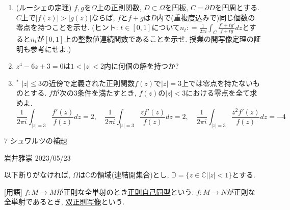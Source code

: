 \documentclass[dvipdfmx,a4paper,11pt]{article}
\newcommand{\C}{\mathbb{C}}
\newcommand{\D}{\mathbb{D}}
\theoremstyle{definition}
\begin{document}
\begin{enumerate}[label=\textbf{問}6.\arabic*]
   \item (ルーシェの定理)
   $f,g$を$\Omega$上の正則関数, $D \subset \Omega$を円板, $C = \partial D$を円周とする.
   $C$上で$|f(z)| > |g(z)|$ならば, $f$と$f+g$は$D$内で(重複度込みで)同じ個数の零点を持つことを示せ.
   (ヒント: $t \in [0,1]$について$n_{t} : = \frac{1}{2 \pi i} \int_{C} \frac{f' + t g'}{f +t g} dz$とすると$n_t$が$[0,1]$上の整数値連続関数であることを示せ. 授業の開写像定理の証明も参考にせよ.)
   
   
   \item $z^4 - 6z + 3=0$は$1 < |z| < 2$内に何個の解を持つか?
 
   
   \item $^{*}$ $|z| \le 3$の近傍で定義された正則関数$f(z)$で$|z|=3$上では零点を持たないものとする. 
   $f$が次の3条件を満たすとき, $f(z)$の$|z |<3$における零点を全て求めよ.
   $$
\frac{1}{2 \pi i} \int_{|z|=3} \frac{f'(z)}{f(z)} dz =2, \quad
\frac{1}{2 \pi i} \int_{|z|=3} \frac{zf'(z)}{f(z)} dz =2, \quad
\frac{1}{2 \pi i} \int_{|z|=3} \frac{z^2f'(z)}{f(z)} dz =-4 
   $$

 
     \end{enumerate}  

\newpage


\begin{center}
{\Large 7 シュワルツの補題}
\end{center}

\begin{flushright}
 岩井雅崇 2023/05/23
\end{flushright}
以下断りがなければ, $\Omega$は$\C$の領域(連結開集合)とし, $\D=\{z \in \C |  |z| <1\}$とする. 

[用語] $f : M \to M$が正則な全単射のとき\underline{正則自己同型}という.
$f : M\to N$が正則な全単射であるとき, \underline{双正則写像}という.
\end{document}

